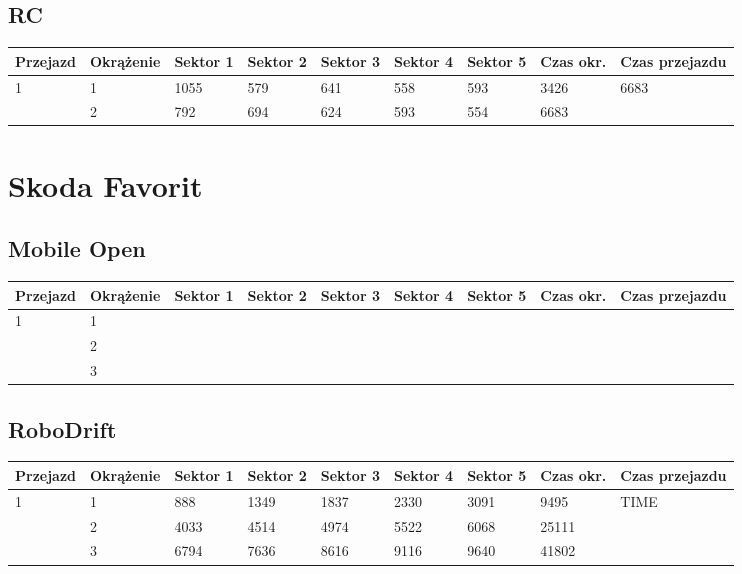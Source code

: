 \documentclass[11pt]{article}
\begin{document}
\subsection{RC}
\begin{table}[h]
\begin{tabular}{|l|l|l|l|l|l|l|l|l|}
\hline
 Przejazd        & Okrążenie & Sektor 1 & Sektor 2 & Sektor 3 & Sektor 4 & Sektor 5 & Czas okr. & Czas przejazdu    \\ \hline
\multirow{2}{*}{1}& 1 &1055& 579& 641& 558& 593& 3426& \multirow{2}{*}{6683} \\ \cline{2-8}
& 2& 792& 694& 624& 593& 554& 6683& \\ \hline
\end{tabular}
\end{table}
\pagebreak
\section{Skoda Favorit}
\subsection{Mobile Open}
\begin{table}[h]
\begin{tabular}{|l|l|l|l|l|l|l|l|l|}
\hline
   Przejazd        & Okrążenie & Sektor 1 & Sektor 2 & Sektor 3 & Sektor 4 & Sektor 5 & Czas okr. & Czas przejazdu    \\ \hline
\multirow{3}{*}{1} & 1         &          &          &          &          &          &           & \multirow{3}{*}{} \\ \cline{2-8}
                         & 2         &          &          &          &          &          &           &                    \\ \cline{2-8}
                         & 3         &          &          &          &          &          &           &                    \\ \hline
\end{tabular}
\end{table}
\subsection{RoboDrift}
\begin{table}[h]
\begin{tabular}{|l|l|l|l|l|l|l|l|l|}
\hline
   Przejazd        & Okrążenie & Sektor 1 & Sektor 2 & Sektor 3 & Sektor 4 & Sektor 5 & Czas okr. & Czas przejazdu    \\ \hline
\multirow{3}{*}{1}& 1 &888& 1349& 1837& 2330& 3091& 9495& \multirow{3}{*}{TIME} \\ \cline{2-8}
& 2& 4033& 4514& 4974& 5522& 6068& 25111& \\ \cline{2-8}
& 3& 6794& 7636& 8616& 9116& 9640& 41802& \\ \hline
\end{tabular}
\end{table}
\end{document}
